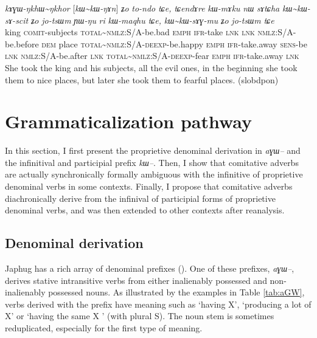 \documentclass[oldfontcommands,oneside,a4paper,11pt]{article}
\newcommand{\ipa}[1]{{\phon\textit{#1}}} %
\newcommand{\tld}{\textasciitilde{}}
\begin{document}
\begin{exe}
\ex \label{ex:kAGWNkhWNkhor}
\gll \ipa{rɟɤlpu}  	\ipa{kɤɣɯ-ŋkhɯ\tld{}ŋkhor}  	[\ipa{kɯ\tld{}kɯ-ŋɤn}]  	\ipa{ʑo}  	\ipa{to-ndo}  	\ipa{tɕe,}  	\ipa{tɕendɤre}  	\ipa{kɯ-mɤku}  	\ipa{nɯ}  	\ipa{sɤtɕha}  	\ipa{kɯ\tld{}kɯ-sɤ-scit}  	\ipa{ʑo}  	\ipa{jo-tsɯm}  	\ipa{ɲɯ-ŋu}  	\ipa{ri}  	\ipa{kɯ-maqhu}  	\ipa{tɕe,}  	\ipa{kɯ\tld{}kɯ-sɤɣ-mu}  	\ipa{ʑo}  	\ipa{jo-tsɯm}  	\ipa{tɕe}  \\
king \textsc{comit}-subjects \textsc{total}\tld{}\textsc{nmlz}:S/A-be.bad \textsc{emph} \textsc{ifr}-take \textsc{lnk}  \textsc{lnk} \textsc{nmlz}:S/A-be.before \textsc{dem} place \textsc{total}\tld{}\textsc{nmlz}:S/A-\textsc{deexp}-be.happy \textsc{emph} \textsc{ifr}-take.away \textsc{sens}-be \textsc{lnk} \textsc{nmlz}:S/A-be.after \textsc{lnk} \textsc{total}\tld{}\textsc{nmlz}:S/A-\textsc{deexp}-fear \textsc{emph} \textsc{ifr}-take.away \textsc{lnk} \\
\glt She took the king and his subjects, all the evil ones, in the beginning she took them to nice places, but later she took them to fearful places. (slobdpon)
\end{exe}


\section{Grammaticalization pathway} 
In this section, I first present the proprietive denominal derivation in \ipa{aɣɯ--} and the infinitival and participial prefix \ipa{kɯ--}. Then, I show that comitative adverbs are actually synchronically formally ambiguous with the infinitive of proprietive denominal verbs in some contexts. Finally, I propose that comitative adverbs diachronically derive from the infinival of participial forms of proprietive denominal verbs, and was then extended to other contexts after reanalysis.


\subsection{Denominal derivation}
Japhug has a rich array of denominal prefixes (\citealt{jacques14antipassive}). One of these prefixes, \ipa{aɣɯ--}, derives stative intransitive verbs from either inalienably possessed and non-inalienably possessed nouns. As illustrated by the examples in Table \ref{tab:aGW}, verbs derived with the prefix have meaning such as `having X', `producing a lot of X' or `having the same X ' (with plural S). The noun stem is sometimes reduplicated, especially for the first type of meaning.
 
\end{document}
